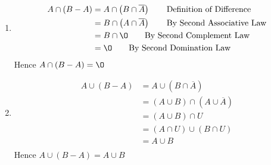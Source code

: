 \documentclass[12pt letter]{report}
\begin{document}
{\begin{enumerate}
		\item
		      \begin{align*}
			      A \cap \left( B - A \right) & =  A \cap \left( B \cap \overline{A} \right) \tag*{Definition of Difference} \\
			                                  & = B \cap \left( A \cap \overline{A} \right) \tag*{By Second Associative Law} \\
			                                  & = B \cap \O \tag*{By Second Complement Law}                                  \\
			                                  & = \O \tag*{By Second Domination Law}                                         \\
		      \end{align*}
		      Hence $A \cap \left( B - A \right) = \O $

		\item
		      \begin{align*}
			      A \cup \left( B - A \right) & = A \cup \left( B \cap \overline{A} \right)  \tag*{Definition of Difference}                       \\
			                                  & = \left( A \cup B \right) \cap \left( A \cup \overline{A} \right) \tag*{By First Distributive Law} \\
			                                  & = \left( A \cup B \right) \cap U  \tag*{By First Complement Law}                                   \\
			                                  & = \left( A \cap U \right) \cup \left( B \cap U  \right) \tag*{By Second
			      Distributive Law}                                                                                                                \\
			                                  & = A \cup B \tag*{By First Identity Law}                                                            \\
		      \end{align*}
		      Hence $A \cup \left( B - A \right) = A \cup B $

	\end{enumerate}
}

\end{document}
